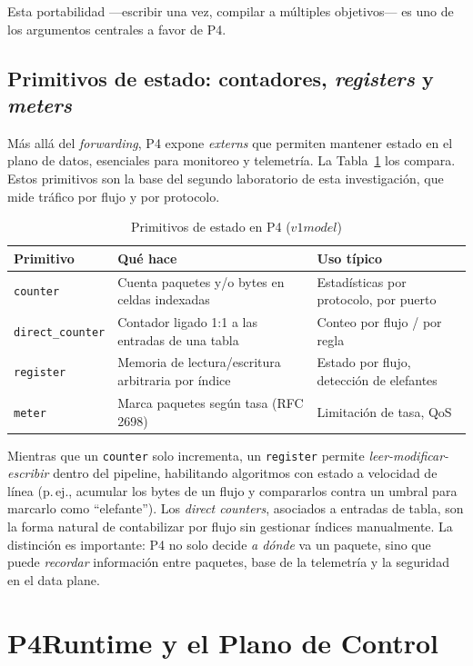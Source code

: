 \documentclass[conference,onecolumn,10pt]{IEEEtran}
\begin{document}
Esta portabilidad —escribir una vez, compilar a múltiples objetivos— es uno de
los argumentos centrales a favor de P4.

\subsection{Primitivos de estado: contadores, \emph{registers} y \emph{meters}}
Más allá del \emph{forwarding}, P4 expone \emph{externs} que permiten mantener
estado en el plano de datos, esenciales para monitoreo y telemetría. La
Tabla~\ref{tab:state} los compara. Estos primitivos son la base del segundo
laboratorio de esta investigación, que mide tráfico por flujo y por protocolo.

\begin{table}[t]
\caption{Primitivos de estado en P4 ($v1model$)}
\label{tab:state}
\centering
\small
\begin{tabular}{@{}p{1.6cm}p{3.0cm}p{2.7cm}@{}}
\toprule
\textbf{Primitivo} & \textbf{Qué hace} & \textbf{Uso típico} \\
\midrule
\texttt{counter} & Cuenta paquetes y/o bytes en celdas indexadas & Estadísticas por protocolo, por puerto \\
\texttt{direct\_counter} & Contador ligado 1:1 a las entradas de una tabla & Conteo por flujo / por regla \\
\texttt{register} & Memoria de lectura/escritura arbitraria por índice & Estado por flujo, detección de elefantes \\
\texttt{meter} & Marca paquetes según tasa (RFC 2698) & Limitación de tasa, QoS \\
\bottomrule
\end{tabular}
\end{table}

Mientras que un \texttt{counter} solo incrementa, un \texttt{register} permite
\emph{leer-modificar-escribir} dentro del pipeline, habilitando algoritmos con
estado a velocidad de línea (p.\,ej., acumular los bytes de un flujo y compararlos
contra un umbral para marcarlo como ``elefante''). Los \emph{direct counters},
asociados a entradas de tabla, son la forma natural de contabilizar por flujo sin
gestionar índices manualmente. La distinción es importante: P4 no solo decide
\emph{a dónde} va un paquete, sino que puede \emph{recordar} información entre
paquetes, base de la telemetría y la seguridad en el data plane.

\section{P4Runtime y el Plano de Control}
\end{document}
